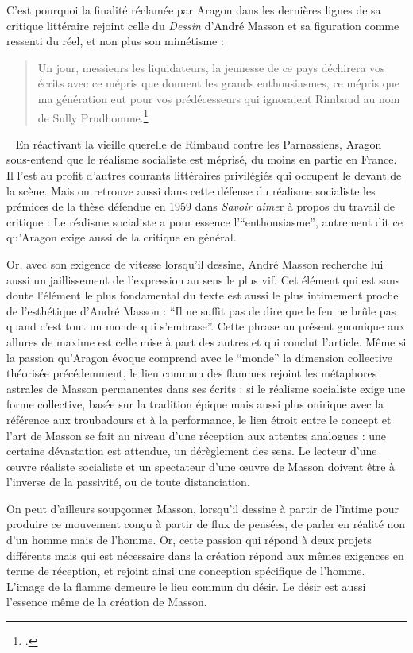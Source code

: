 	C’est pourquoi la finalité réclamée par Aragon dans les dernières lignes de sa critique littéraire rejoint celle du \emph{Dessin} d’André Masson et sa figuration comme ressenti du réel, et non plus son mimétisme : 
\begin{quote}
Un jour, messieurs les liquidateurs, la jeunesse de ce pays déchirera vos écrits avec ce mépris que donnent les grands enthousiasmes, ce mépris que ma génération eut pour vos prédécesseurs qui ignoraient Rimbaud au nom de Sully Prudhomme.\footcite{realsoc}\end{quote}
 
	 En réactivant la vieille querelle de Rimbaud contre les Parnassiens, Aragon sous-entend que le réalisme socialiste est méprisé, du moins en partie en France. Il l'est au profit d’autres courants littéraires privilégiés qui occupent le devant de la scène. Mais on retrouve aussi dans cette défense du réalisme socialiste les prémices de la thèse défendue en 1959 dans \emph{Savoir aime}r à propos du travail de critique : Le réalisme socialiste a pour essence l’\enquote{enthousiasme}, autrement dit ce qu’Aragon exige aussi de la critique en général.  

	Or, avec son exigence de vitesse lorsqu’il dessine, André Masson recherche lui aussi un jaillissement de l’expression au sens le plus vif. Cet élément qui est sans doute l’élément le plus fondamental du texte est aussi le plus intimement proche de l’esthétique d’André Masson : \enquote{Il ne suffit pas de dire que le feu ne brûle pas quand c’est tout un monde qui s’embrase}. Cette phrase au présent gnomique aux allures de maxime est celle mise à part des autres et qui conclut l’article. Même si la passion qu’Aragon évoque comprend avec le \enquote{monde} la dimension collective théorisée précédemment, le lieu commun des flammes rejoint les métaphores astrales de Masson permanentes dans ses écrits : si le réalisme socialiste exige une forme collective, basée sur la tradition épique mais aussi plus onirique avec la référence aux troubadours et à la performance, le lien étroit entre le concept et l’art de Masson se fait au niveau d’une réception aux attentes analogues : une certaine dévastation est attendue, un dérèglement des sens. Le lecteur d’une \oe{}uvre réaliste socialiste et un spectateur d’une \oe{}uvre de Masson doivent être à l’inverse de la passivité, ou de toute distanciation. 

	On peut d’ailleurs soupçonner Masson, lorsqu'il dessine à partir de l’intime pour produire ce mouvement conçu à partir de flux de pensées, de parler en réalité non d’un homme mais de l’homme. Or, cette passion qui répond à deux projets différents mais qui est nécessaire dans la création répond aux mêmes exigences en terme de réception, et rejoint ainsi une conception spécifique de l’homme. L’image de la flamme demeure le lieu commun du désir. Le désir est aussi l’essence même de la création de Masson. 

